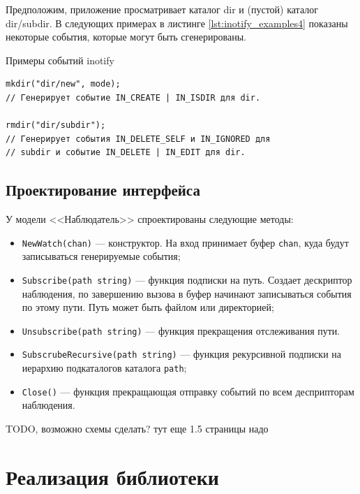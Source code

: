 \documentclass[14pt, russian]{scrartcl}
\newcommand{\code}[1]{\texttt{#1}}
\begin{document}
Предположим, приложение просматривает каталог dir и (пустой) каталог dir/subdir.
В следующих примерах в листинге \ref{lst:inotify_examples4} показаны некоторые события, которые могут быть
сгенерированы.

\begin{listing}
\caption{Примеры событий inotify}
\label{lst:inotify_examples4}
\begin{verbatim}
mkdir("dir/new", mode);
// Генерирует событие IN_CREATE | IN_ISDIR для dir.

rmdir("dir/subdir");
// Генерирует события IN_DELETE_SELF и IN_IGNORED для
// subdir и событие IN_DELETE | IN_EDIT для dir.
\end{verbatim}
\end{listing}

\subsection{Проектирование интерфейса}

У модели <<Наблюдатель>> спроектированы следующие методы:

\begin{itemize}
  \item \code{NewWatch(chan)} --- конструктор. На вход принимает буфер
        \code{chan}, куда будут записываться генерируемые события;
  \item \code{Subscribe(path string)} --- функция подписки на путь. Создает
        дескриптор наблюдения, по завершению вызова в буфер начинают
        записываться события по этому пути. Путь может быть файлом или
        директорией;
  \item \code{Unsubscribe(path string)} --- функция прекращения отслеживания пути.
  \item \code{SubscrubeRecursive(path string)} --- функция рекурсивной подписки
        на иерархию подкаталогов каталога \code{path};
  \item \code{Close()} --- функция прекращающая отправку событий по всем
        десприпторам наблюдения.
\end{itemize}

TODO, возможно схемы сделать? тут еще 1.5 страницы надо

\section{Реализация библиотеки}
\end{document}

